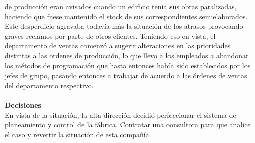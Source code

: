 \documentclass[a4paper,10pt]{article}
\begin{document}
de producción eran avisados cuando un edificio tenía sus obras paralizadas, haciendo
que fuese mantenido el stock de sus correspondientes semielaborados. Este desperdicio
agravaba todavía más la situación de los atrasos provocando graves reclamos por parte
de otros clientes. Teniendo eso en vista, el departamento de ventas comenzó a sugerir
alteraciones en las prioridades distintas a las ordenes de producción, lo que llevo a los
empleados a abandonar los métodos de programación que hasta entonces había sido
establecidos por los jefes de grupo, pasando entonces a trabajar de acuerdo a las
órdenes de ventas del departamento respectivo.\\ \\
\textbf{Decisiones}\\
En vista de la situación, la alta dirección decidió perfeccionar el sistema de planeamiento y control de la fábrica. Contratar una consultora para que analice el caso y revertir la situación de esta compañía.
\end{document}
